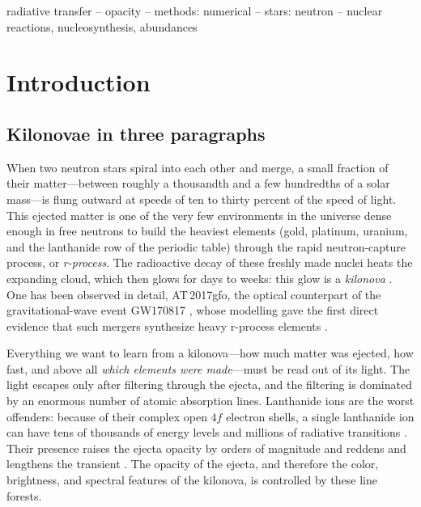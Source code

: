 \documentclass[fleqn,usenatbib]{mnras}
\begin{document}
\begin{keywords}
radiative transfer -- opacity -- methods: numerical -- stars: neutron --
nuclear reactions, nucleosynthesis, abundances
\end{keywords}

\section{Introduction}
\label{sec:intro}

\subsection{Kilonovae in three paragraphs}

When two neutron stars spiral into each other and merge, a small fraction of
their matter---between roughly a thousandth and a few hundredths of a solar
mass---is flung outward at speeds of ten to thirty percent of the speed of
light. This ejected matter is one of the very few environments in the
universe dense enough in free neutrons to build the heaviest elements
(gold, platinum, uranium, and the lanthanide row of the periodic table)
through the rapid neutron-capture process, or \emph{r-process}. The
radioactive decay of these freshly made nuclei heats the expanding cloud,
which then glows for days to weeks: this glow is a \emph{kilonova}
\citep[for a review see][]{metzger2020}. One has been observed in detail,
AT\,2017gfo, the optical counterpart of the gravitational-wave event GW170817
\citep{gw170817}, whose modelling gave the first direct evidence that such
mergers synthesize heavy r-process elements \citep{kasen2017}.

Everything we want to learn from a kilonova---how much matter was ejected,
how fast, and above all \emph{which elements were made}---must be read out of
its light. The light escapes only after filtering through the ejecta, and the
filtering is dominated by an enormous number of atomic absorption lines.
Lanthanide ions are the worst offenders: because of their complex open
$4f$ electron shells, a single lanthanide ion can have tens of thousands of
energy levels and millions of radiative transitions
\citep{tanaka2020,gsi_atomic}. Their presence raises the ejecta opacity by
orders of magnitude and reddens and lengthens the transient
\citep{barneskasen2013}. The opacity of the ejecta, and therefore the color,
brightness, and spectral features of the kilonova, is controlled by these
line forests.
\end{document}

